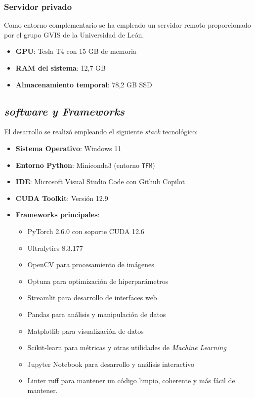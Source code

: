\documentclass[12pt,a4paper,onecolumn,oneside]{report}
\begin{document}
\subsubsection{Servidor privado}
\label{sec:servidor_privado}
Como entorno complementario se ha empleado un servidor remoto proporcionado por el grupo GVIS de la Universidad de León.

\begin{itemize}
    \item \textbf{GPU}: Tesla T4 con 15 GB de memoria
    \item \textbf{RAM del sistema}: 12,7 GB
    \item \textbf{Almacenamiento temporal}: 78,2 GB SSD
\end{itemize}

\subsection{\textit{software y Frameworks}}

El desarrollo se realizó empleando el siguiente \textit{stack} tecnológico:

\begin{itemize}
    \item \textbf{Sistema Operativo}: Windows 11
    \item \textbf{Entorno Python}: Miniconda3 (entorno \texttt{TFM})
    \item \textbf{IDE}: Microsoft Visual Studio Code con Github Copilot
    \item \textbf{CUDA Toolkit}: Versión 12.9
    \item \textbf{Frameworks principales}:
    \begin{itemize}
        \item PyTorch 2.6.0 con soporte CUDA 12.6
        \item Ultralytics 8.3.177
        \item OpenCV para procesamiento de imágenes
        \item Optuna para optimización de hiperparámetros 
        \item Streamlit para desarrollo de interfaces web
        \item Pandas para análisis y manipulación de datos
        \item Matplotlib para visualización de datos 
        \item Scikit-learn para métricas y otras utilidades de \textit{Machine Learning}
        \item Jupyter Notebook para desarrollo y análisis interactivo
        \item Linter ruff para mantener un código limpio, coherente y más fácil de mantener.
    \end{itemize}
\end{itemize}
\end{document}

